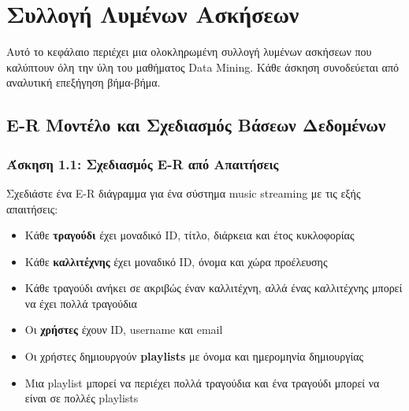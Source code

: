 
\chapter{Συλλογή Λυμένων Ασκήσεων}
\label{ch:solved-exercises}

Αυτό το κεφάλαιο περιέχει μια ολοκληρωμένη συλλογή λυμένων ασκήσεων που καλύπτουν
όλη την ύλη του μαθήματος Data Mining. Κάθε άσκηση συνοδεύεται από αναλυτική
επεξήγηση βήμα-βήμα.

\section{E-R Μοντέλο και Σχεδιασμός Βάσεων Δεδομένων}

\subsection{Άσκηση 1.1: Σχεδιασμός E-R από Απαιτήσεις}

\begin{formulabox}[Εκφώνηση]
Σχεδιάστε ένα E-R διάγραμμα για ένα σύστημα music streaming με τις εξής απαιτήσεις:
\begin{itemize}
    \item Κάθε \textbf{τραγούδι} έχει μοναδικό ID, τίτλο, διάρκεια και έτος κυκλοφορίας
    \item Κάθε \textbf{καλλιτέχνης} έχει μοναδικό ID, όνομα και χώρα προέλευσης
    \item Κάθε τραγούδι ανήκει σε ακριβώς έναν καλλιτέχνη, αλλά ένας καλλιτέχνης μπορεί να έχει πολλά τραγούδια
    \item Οι \textbf{χρήστες} έχουν ID, username και email
    \item Οι χρήστες δημιουργούν \textbf{playlists} με όνομα και ημερομηνία δημιουργίας
    \item Μια playlist μπορεί να περιέχει πολλά τραγούδια και ένα τραγούδι μπορεί να είναι σε πολλές playlists
\end{itemize}
\end{formulabox}

